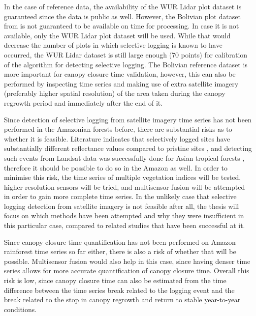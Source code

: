 \documentclass[a4paper,10pt]{article}
\begin{document}
In the case of reference data, the availability of the \ac{WUR} Lidar plot dataset is guaranteed since the data is public as well. However, the Bolivian plot dataset from \citet{broadbent_recovery_2006} is not guaranteed to be available on time for processing. In case it is not available, only the \ac{WUR} Lidar plot dataset will be used. While that would decrease the number of plots in which selective logging is known to have occurred, the \ac{WUR} Lidar dataset is still large enough (70 points) for calibration of the algorithm for detecting selective logging. The Bolivian reference dataset is more important for canopy closure time validation, however, this can also be performed by inspecting time series and making use of extra satellite imagery (preferably higher spatial resolution) of the area taken during the canopy regrowth period and immediately after the end of it.

Since detection of selective logging from satellite imagery time series has not been performed in the Amazonian forests before, there are substantial risks as to whether it is feasible. Literature indicates that selectively logged sites have substantially different reflectance values compared to pristine sites \citep{broadbent_recovery_2006}, and detecting such events from Landsat data was successfully done for Asian tropical forests \citep{shimizu_using_2017}, therefore it should be possible to do so in the Amazon as well. In order to minimise this risk, the time series of multiple vegetation indices will be tested, higher resolution sensors will be tried, and multisensor fusion will be attempted in order to gain more complete time series. In the unlikely case that selective logging detection from satellite imagery is not feasible after all, the thesis will focus on which methods have been attempted and why they were insufficient in this particular case, compared to related studies that have been successful at it.

Since canopy closure time quantification has not been performed on Amazon rainforest time series so far either, there is also a risk of whether that will be possible. Multisensor fusion would also help in this case, since having denser time series allows for more accurate quantification of canopy closure time. Overall this risk is low, since canopy closure time can also be estimated from the time difference between the time series break related to the logging event and the break related to the stop in canopy regrowth and return to stable year-to-year conditions.
\end{document}
